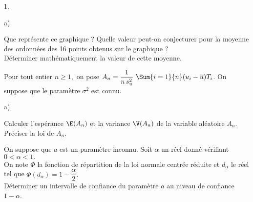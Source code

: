 \begin{noliste}{1.}
\begin{noliste}{a)}
\begin{center}
{}
\end{center}


\newpage


 Que représente ce graphique ?
 Quelle valeur peut-on conjecturer pour 
 la moyenne des ordonnées des 16 points obtenus sur le graphique ?\\
 Déterminer mathématiquement la valeur de cette moyenne.
 
 
 \end{noliste}
 
 \item Pour tout entier $n \geq 1,$ on pose 
 $A_n=\dfrac{1}{n \, s_u^2} \ \Sum{i=1}{n} (u_i-\overline{u})T_i$. On 
 suppose que le paramètre $\sigma^2$ est connu.
 \begin{noliste}{a)}
  \item Calculer l'espérance $\E(A_n)$ et la variance $\V(A_n)$ de la 
  variable aléatoire $A_n$. \\
  Préciser la loi de $A_n$.
  
  

  
  \item On suppose que $a$ est un paramètre inconnu. Soit $\alpha$ un 
  réel donné vérifiant $0 < \alpha < 1.$\\
  On note $\Phi$ la fonction de répartition de la loi normale centrée 
  réduite et $d_\alpha$ le réel tel que $\Phi(d_\alpha) = 
  1-\dfrac{\alpha}{2}.$\\
  Déterminer un intervalle de confiance du paramètre $a$ au niveau de 
  confiance $1-\alpha$.
  
  
 \end{noliste}
\end{noliste}








